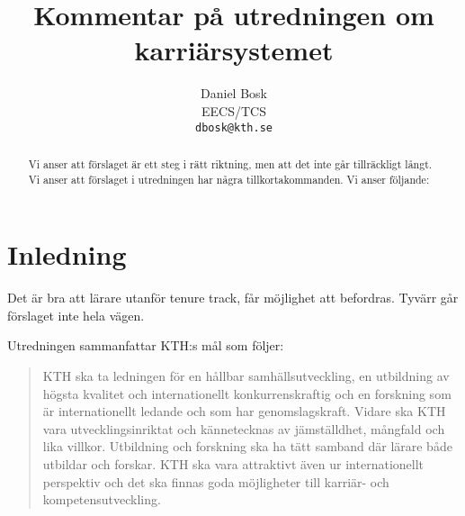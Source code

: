 \documentclass[a4paper,oneside,article,swedish]{memoir}
\title{Kommentar på utredningen om karriärsystemet}
\author{%
  Daniel Bosk\\EECS/TCS\\\texttt{dbosk@kth.se}
}
\let\section\chapter
\begin{document}
\maketitle
\begin{abstract}
  Vi anser att förslaget är ett steg i rätt riktning, men att det inte går 
  tillräckligt långt.
  Vi anser att förslaget i utredningen har några tillkortakommanden.
  Vi anser följande:
  
\end{abstract}
\clearpage
\tableofcontents*
\clearpage


\section{Inledning}

Det är bra att lärare utanför tenure track, får möjlighet att befordras.
Tyvärr går förslaget inte hela vägen.

Utredningen\autocite{utredning} sammanfattar KTH:s mål som följer:
\blockcquote[s.~2]{utredning}{%
  KTH ska ta ledningen för en hållbar samhällsutveckling, en utbildning av 
  högsta kvalitet och internationellt konkurrenskraftig och en forskning som 
  är internationellt ledande och som har genomslagskraft.
  Vidare ska KTH vara utvecklingsinriktat och kännetecknas av jämställdhet, 
  mångfald och lika villkor.
  Utbildning och forskning ska ha tätt samband där lärare både utbildar och 
  forskar.
  KTH ska vara attraktivt även ur internationellt perspektiv och det ska 
  finnas goda möjligheter till karriär- och kompetensutveckling.%
}
\end{document}
